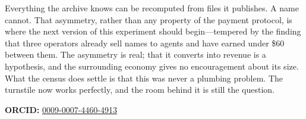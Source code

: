 \documentclass[10pt,letterpaper,twocolumn]{article}
\begin{document}
Everything the archive knows can be recomputed from files it publishes. A name
cannot. That asymmetry, rather than any property of the payment protocol, is
where the next version of this experiment should begin---tempered by the
finding that three operators already sell names to agents and have earned
under \$60 between them. The asymmetry is real; that it converts into revenue
is a hypothesis, and the surrounding economy gives no encouragement about its
size. What the census does settle is that this was never a plumbing problem.
The turnstile now works perfectly, and the room behind it is still the
question.

\vspace{0.5em}

\vspace{0.5em}
\noindent\textbf{ORCID:} \href{https://orcid.org/0009-0007-4460-4913}{0009-0007-4460-4913}

\def\bibfont{\footnotesize}
\setlength{\bibsep}{0.25em}


\end{document}
